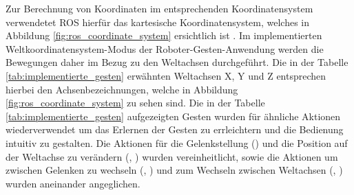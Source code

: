 Zur Berechnung von Koordinaten im entsprechenden Koordinatensystem verwendetet ROS hierfür das kartesische Koordinatensystem, welches in Abbildung \ref{fig:ros_coordinate_system} ersichtlich ist \cite{guo_irc-set_2019}. Im implementierten Weltkoordinatensystem-Modus der Roboter-Gesten-Anwendung werden die Bewegungen daher im Bezug zu den Weltachsen durchgeführt. Die in der Tabelle \ref{tab:implementierte_gesten} erwähnten Weltachsen X, Y und Z entsprechen hierbei den Achsenbezeichnungen, welche in Abbildung \ref{fig:ros_coordinate_system} zu sehen sind. Die in der Tabelle \ref{tab:implementierte_gesten} aufgezeigten Gesten wurden für ähnliche Aktionen wiederverwendet um das Erlernen der Gesten zu errleichtern und die Bedienung intuitiv zu gestalten. Die Aktionen für die Gelenkstellung () und die Position auf der Weltachse zu verändern (, ) wurden vereinheitlicht, sowie die Aktionen um zwischen Gelenken zu wechseln (, ) und zum Wechseln zwischen Weltachsen (, ) wurden aneinander angeglichen.

